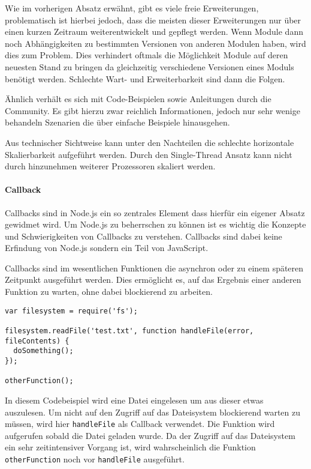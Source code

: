 \documentclass[]{article}
\begin{document}
Wie im vorherigen Absatz erwähnt, gibt es viele freie Erweiterungen,
problematisch ist hierbei jedoch, dass die meisten dieser Erweiterungen
nur über einen kurzen Zeitraum weiterentwickelt und gepflegt werden.
Wenn Module dann noch Abhängigkeiten zu bestimmten Versionen von anderen
Modulen haben, wird dies zum Problem. Dies verhindert oftmals die
Möglichkeit Module auf deren neuesten Stand zu bringen da gleichzeitig
verschiedene Versionen eines Moduls benötigt werden. Schlechte Wart- und
Erweiterbarkeit sind dann die Folgen.

Ähnlich verhält es sich mit Code-Beispielen sowie Anleitungen durch die
Community. Es gibt hierzu zwar reichlich Informationen, jedoch nur sehr
wenige behandeln Szenarien die über einfache Beispiele hinausgehen.

Aus technischer Sichtweise kann unter den Nachteilen die schlechte
horizontale Skalierbarkeit aufgeführt werden. Durch den Single-Thread
Ansatz kann nicht durch hinzunehmen weiterer Prozessoren skaliert
werden.

\paragraph{Callback}\label{callback}

Callbacks sind in Node.js ein so zentrales Element dass hierfür ein
eigener Absatz gewidmet wird. Um Node.js zu beherrschen zu können ist es
wichtig die Konzepte und Schwierigkeiten von Callbacks zu verstehen.
Callbacks sind dabei keine Erfindung von Node.js sondern ein Teil von
JavaScript.

Callbacks sind im wesentlichen Funktionen die asynchron oder zu einem
späteren Zeitpunkt ausgeführt werden. Dies ermöglicht es, auf das
Ergebnis einer anderen Funktion zu warten, ohne dabei blockierend zu
arbeiten.

\begin{verbatim}
var filesystem = require('fs');

filesystem.readFile('test.txt', function handleFile(error, fileContents) {
  doSomething();
});

otherFunction();
\end{verbatim}

In diesem Codebeispiel wird eine Datei eingelesen um aus dieser etwas
auszulesen. Um nicht auf den Zugriff auf das Dateisystem blockierend
warten zu müssen, wird hier \texttt{handleFile} als Callback verwendet.
Die Funktion wird aufgerufen sobald die Datei geladen wurde. Da der
Zugriff auf das Dateisystem ein sehr zeitintensiver Vorgang ist, wird
wahrscheinlich die Funktion \texttt{otherFunction} noch vor
\texttt{handleFile} ausgeführt.
\end{document}
